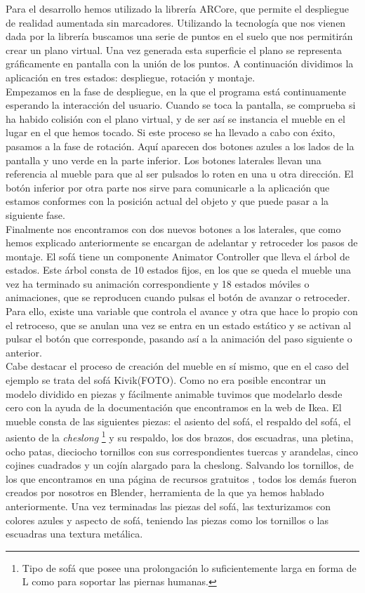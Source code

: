 Para el desarrollo hemos utilizado la librería ARCore, que permite el despliegue de realidad aumentada sin marcadores. Utilizando la tecnología que nos vienen dada por la librería buscamos una serie de puntos en el suelo que nos permitirán crear un plano virtual. Una vez generada esta superficie el plano se representa gráficamente en pantalla con la unión de los puntos. A continuación dividimos la aplicación en tres estados: despliegue, rotación y montaje.\\ 

Empezamos en la fase de despliegue, en la que el programa está continuamente esperando la interacción del usuario. Cuando se toca la pantalla, se comprueba si ha habido colisión con el plano virtual, y de ser así se instancia el mueble en el lugar en el que hemos tocado. Si este proceso se ha llevado a cabo con éxito, pasamos a la fase de rotación. Aquí aparecen dos botones azules a los lados de la pantalla y uno verde en la parte inferior. Los botones laterales llevan una referencia al mueble para que al ser pulsados lo roten en una u otra dirección. El botón inferior por otra parte nos sirve para comunicarle a la aplicación que estamos conformes con la posición actual del objeto y que puede pasar a la siguiente fase.\\ 

Finalmente nos encontramos con dos nuevos botones a los laterales, que como hemos explicado anteriormente se encargan de adelantar y retroceder los pasos de montaje. El sofá tiene un componente Animator Controller que lleva el árbol de estados. Este árbol consta de 10 estados fijos, en los que se queda el mueble una vez ha terminado su animación correspondiente y 18 estados móviles o animaciones, que se reproducen cuando pulsas el botón de avanzar o retroceder. Para ello, existe una variable que controla el avance y otra que hace lo propio con el retroceso, que se anulan una vez se entra en un estado estático y se activan al pulsar el botón que corresponde, pasando así a la animación del paso siguiente o anterior.\\

Cabe destacar el proceso de creación del mueble en sí mismo, que en el caso del ejemplo se trata del sofá Kivik(FOTO). Como no era posible encontrar un modelo dividido en piezas y fácilmente animable tuvimos que modelarlo desde cero con la ayuda de la documentación que encontramos en la web de Ikea. El mueble consta de las siguientes piezas: el asiento del sofá, el respaldo del sofá, el asiento de la \textit{cheslong} \footnote{ Tipo de sofá que posee una prolongación lo suficientemente larga en forma de L como para soportar las piernas humanas.} y su respaldo, los dos brazos, dos escuadras, una pletina, ocho patas, dieciocho tornillos con sus correspondientes tuercas y arandelas, cinco cojines cuadrados y un cojín alargado para la cheslong. Salvando los tornillos, de los que encontramos en una página de recursos gratuitos \cite{tornillos}, todos los demás fueron creados por nosotros en Blender, herramienta de la que ya hemos hablado anteriormente. Una vez terminadas las piezas del sofá, las texturizamos con colores azules y aspecto de sofá, teniendo las piezas como los tornillos o las escuadras una textura metálica.\\


